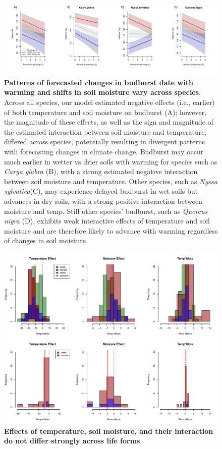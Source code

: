 \documentclass{article}
\begin{document}
 
 \begin{figure}[h]
\centering
 \includegraphics{../../Analyses/soilmoisture/figures/tempforecast_bb_0_5_28_105_135_4_degwarm.pdf}
 
 \caption{\textbf{Patterns of forecasted changes in budburst date with warming and shifts in soil moisture vary across species}. Across all species, our model estimated negative effects (i.e., earlier) of both temperature and soil moisture on budburst (A); however, the magnitude of these effects, as well as the sign and magnitude of the estimated interaction between soil moisture and temperature, differed across species, potentially resulting in divergent patterns with forecasting changes in climate change.  Budburst may occur much earlier in wetter vs drier soils with warming for species such as \textit{Carya glabra} (B), with a strong estimated negative interaction between soil moisture and temperature. Other species, such as \textit{Nyssa sylvatica}(C), may experience delayed budburst in wet soils but advances in dry soils, with a strong positive interaction between moisture and temp. Still other species' budburst, such as \textit{Quercus nigra} (D), exhibits weak interactive effects of temperature and soil moisture and are therefore likely to advance with warming regardless of changes in soil moisture.}
 \label{fig:bbsp}
 \end{figure}
 
  
 \begin{figure}[h]
\centering
 \includegraphics{../../Analyses/soilmoisture/figures/histbbloform_spef.pdf}
 \caption{\textbf{Effects of temperature, soil moisture, and their interaction do not differ strongly across life forms}.}
 \label{fig:forms}
 \end{figure}

 
 
 
\end{document}
